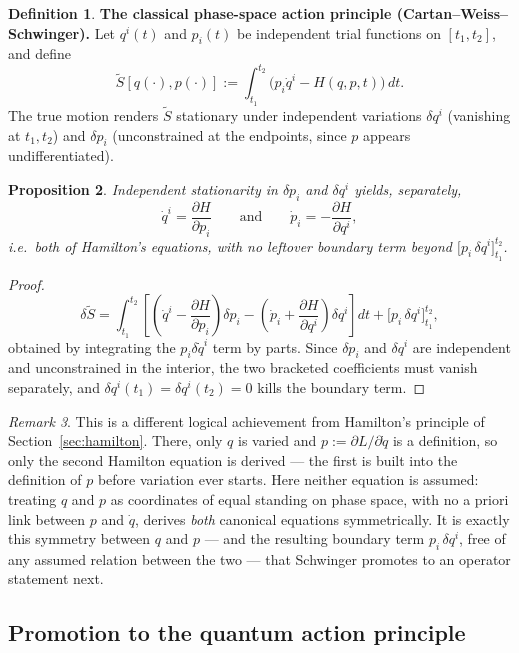 \documentclass[11pt]{book}
\theoremstyle{definition}
\newtheorem{definition}{Definition}[section]
\theoremstyle{plain}
\newtheorem{proposition}[definition]{Proposition}
\theoremstyle{remark}
\newtheorem{remark}[definition]{Remark}
\begin{document}
\begin{definition}
\textbf{The classical phase-space action principle (Cartan--Weiss--Schwinger).} Let $q^i(t)$ and $p_i(t)$ be independent trial functions on $[t_1,t_2]$, and define
\[
\tilde S[q(\cdot),p(\cdot)] := \int_{t_1}^{t_2}\big(p_i\dot q^i - H(q,p,t)\big)\,dt .
\]
The true motion renders $\tilde S$ stationary under independent variations $\delta q^i$ (vanishing at $t_1,t_2$) and $\delta p_i$ (unconstrained at the endpoints, since $p$ appears undifferentiated).
\end{definition}

\begin{proposition}
Independent stationarity in $\delta p_i$ and $\delta q^i$ yields, separately,
\[
\dot q^i = \frac{\partial H}{\partial p_i}
\qquad\text{and}\qquad
\dot p_i = -\frac{\partial H}{\partial q^i},
\]
i.e.\ \emph{both} of Hamilton's equations, with no leftover boundary term beyond $\big[p_i\,\delta q^i\big]_{t_1}^{t_2}$.
\end{proposition}
\begin{proof}
\[
\delta\tilde S = \int_{t_1}^{t_2}\left[\left(\dot q^i - \frac{\partial H}{\partial p_i}\right)\delta p_i - \left(\dot p_i + \frac{\partial H}{\partial q^i}\right)\delta q^i\right]dt + \big[p_i\,\delta q^i\big]_{t_1}^{t_2},
\]
obtained by integrating the $p_i\delta\dot q^i$ term by parts. Since $\delta p_i$ and $\delta q^i$ are independent and unconstrained in the interior, the two bracketed coefficients must vanish separately, and $\delta q^i(t_1)=\delta q^i(t_2)=0$ kills the boundary term.
\end{proof}

\begin{remark}
This is a different logical achievement from Hamilton's principle of Section~\ref{sec:hamilton}. There, only $q$ is varied and $p:=\partial L/\partial\dot q$ is a definition, so only the second Hamilton equation is derived --- the first is built into the definition of $p$ before variation ever starts. Here neither equation is assumed: treating $q$ and $p$ as coordinates of equal standing on phase space, with no a priori link between $p$ and $\dot q$, derives \emph{both} canonical equations symmetrically. It is exactly this symmetry between $q$ and $p$ --- and the resulting boundary term $p_i\,\delta q^i$, free of any assumed relation between the two --- that Schwinger promotes to an operator statement next.
\end{remark}

\subsection{Promotion to the quantum action principle}
\label{sec:schwinger-quantum}
\end{document}
